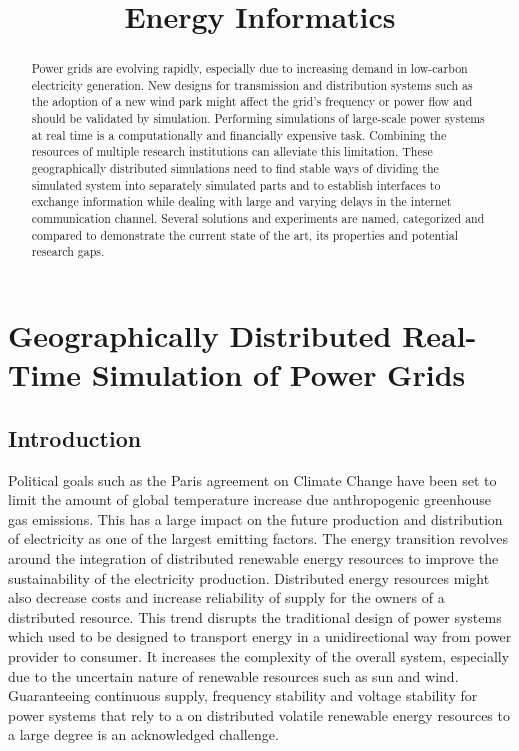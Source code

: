 \documentclass[a4paper,ngerman]{atseminar}
\title{Energy Informatics}
\author{}
\begin{document}
\maketitle

\ENGLISH

\section{Geographically Distributed Real-Time Simulation of Power Grids}

\begin{abstract}
Power grids are evolving rapidly, especially due to increasing demand in low-carbon electricity generation. New designs for transmission and distribution systems such as the adoption of a new wind park might affect the grid's frequency or power flow and should be validated by simulation. Performing simulations of large-scale power systems at real time is a computationally and financially expensive task. Combining the resources of multiple research institutions can alleviate this limitation. 
These geographically distributed simulations need to find stable ways of dividing the simulated system into separately simulated parts and to establish interfaces to exchange information while dealing with large and varying delays in the internet communication channel. Several solutions and experiments are named, categorized and compared to demonstrate the current state of the art, its properties and potential research gaps.

\end{abstract}

\subsection{Introduction}

Political goals such as the Paris agreement on Climate Change have been set to limit the amount of global temperature increase due anthropogenic greenhouse gas emissions. This has a large impact on the future production and distribution of electricity as one of the largest emitting factors. The energy transition revolves around the integration of distributed renewable energy resources to improve the sustainability of the electricity production. Distributed energy resources might also decrease costs and increase reliability of supply for the owners of a distributed resource.
This trend disrupts the traditional design of power systems which used to be designed to transport energy in a unidirectional way from power provider to consumer. It increases the complexity of the overall system, especially due to the uncertain nature of renewable resources such as sun and wind. Guaranteeing continuous supply, frequency stability and voltage stability for power systems that rely to a on distributed volatile renewable energy resources to a large degree is an acknowledged challenge.
\end{document}

